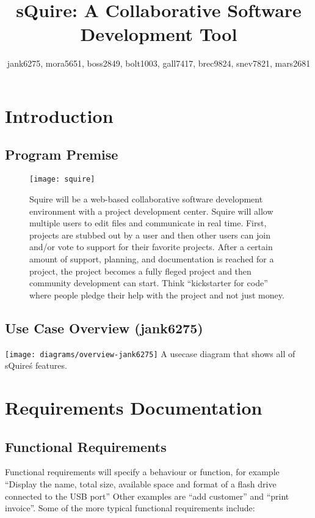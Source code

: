 \documentclass[11pt]{report}
\title{sQuire: A Collaborative Software Development Tool}
\author{jank6275, mora5651, boss2849, bolt1003, gall7417, brec9824, snev7821, mars2681}
\begin{document}
\maketitle

\tableofcontents

\chapter{Introduction}

\section{Program Premise}
    \begin{figure}[h!]
        \caption{Squire will be a web-based collaborative software development environment with a project development center. Squire will allow multiple users to edit files and communicate in real time. First, projects are stubbed out by a user and then other users can join and/or vote to support for their favorite projects. After a certain amount of support, planning, and documentation is reached for a project, the project becomes a fully fleged project and then community development can start. Think ``kickstarter for code'' where people pledge their help with the project and not just money.}
        \texttt{[image: squire]}
    \end{figure}

\section{Use Case Overview (jank6275)}
    \texttt{[image: diagrams/overview-jank6275]}
    A usecase diagram that shows all of sQuire\'s features.

\chapter{Requirements Documentation}

\section{Functional Requirements}
    Functional requirements will specify a behaviour or function, for example ``Display the name, total size, available space and format of a flash drive connected to the USB port'' Other examples are ``add customer'' and ``print invoice''. Some of the more typical functional requirements include:
    
\end{document}

